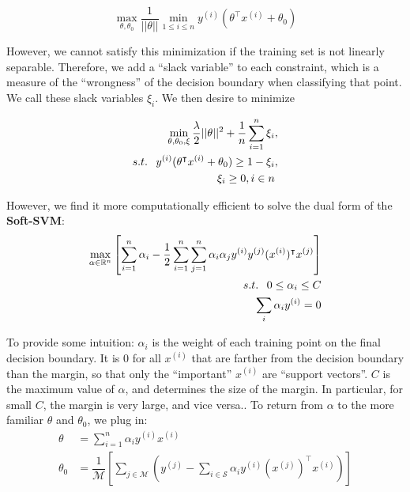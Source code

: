 \documentclass[10pt,letterpaper]{article}
\begin{document}
\begin{equation}
\max_{\theta, \theta_0} \dfrac{1}{||\theta||} \min_{1 \le i \le n} y^{(i)} (\theta^\intercal x^{(i)} + \theta_0)
\end{equation}

However, we cannot satisfy this minimization if the training set is not linearly separable. Therefore, we add a ``slack variable'' to each constraint, which is a measure of the ``wrongness'' of the decision boundary when classifying that point. We call these slack variables $\xi_i$. We then desire to minimize

\begin{align}
\min_{\theta, \theta_0, \xi} \dfrac{\lambda}{2} ||\theta||^2 + \dfrac{1}{n} \sum_{i=1}^{n} \xi_{i} &, \\
s.t. \hspace{.75em} y^{(i)}(\theta^\intercal x^{(i)} + \theta_0) \ge 1 - \xi_i &, \\
\xi_i \ge 0, i \in n &
\end{align}

However, we find it more computationally efficient to solve the dual form of the \textbf{Soft-SVM}:
\begin{align}
\max_{\alpha \in \mathbb{R}^n} \left[ \sum_{i=1}^n \alpha_i - \dfrac{1}{2} \sum_{i=1}^n \sum_{j=1}^n \alpha_i \alpha_j y^{(i)} y^{(j)} (x^{(i)})^\intercal x^{(j)}\right] & \\
s.t. \hspace{.75em} 0 \le \alpha_i \le C & \\
\sum_i \alpha_i y^{(i)} = 0 &
\end{align}

To provide some intuition: $\alpha_i$ is the weight of each training point on the final decision boundary. It is 0 for all $x^{(i)}$ that are farther from the decision boundary than the margin, so that only the ``important'' $x^{(i)}$ are ``support vectors''. $C$ is the maximum value of $\alpha$, and determines the size of the margin. In particular, for small $C$, the margin is very large, and vice versa.. To return from $\alpha$ to the more familiar $\theta$ and $\theta_0$, we plug in:
\begin{align}
\theta &= \sum_{i=1}^n \alpha_i y^{(i)} x^{(i)} \\
\theta_0 &= \dfrac{1}{\mathcal{M}} \left[ \sum_{j \in \mathcal{M}} \left( y^{(j)} - \sum_{i \in \mathcal{S}} \alpha_i y^{(i)} (x^{(j)})^\intercal x^{(i)} \right) \right]
\end{align}
\end{document}
